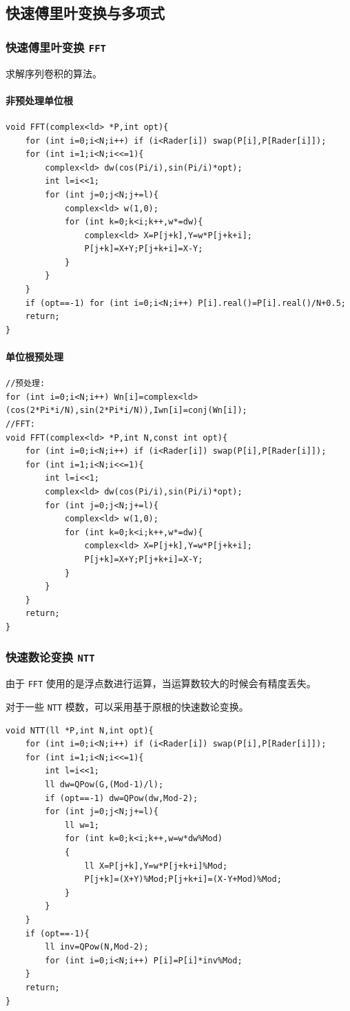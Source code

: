 \documentclass[UTF-8]{ctexart}
\begin{document}
	\subsection{快速傅里叶变换与多项式}
	\subsubsection{快速傅里叶变换 \texttt{FFT}}
	求解序列卷积的算法。
	\paragraph{非预处理单位根}
\begin{verbatim}
void FFT(complex<ld> *P,int opt){
    for (int i=0;i<N;i++) if (i<Rader[i]) swap(P[i],P[Rader[i]]);
    for (int i=1;i<N;i<<=1){
        complex<ld> dw(cos(Pi/i),sin(Pi/i)*opt);
        int l=i<<1;
        for (int j=0;j<N;j+=l){
            complex<ld> w(1,0);
            for (int k=0;k<i;k++,w*=dw){
                complex<ld> X=P[j+k],Y=w*P[j+k+i];
                P[j+k]=X+Y;P[j+k+i]=X-Y;
            }
        }
    }
    if (opt==-1) for (int i=0;i<N;i++) P[i].real()=P[i].real()/N+0.5;
    return;
}
\end{verbatim}
    \paragraph{单位根预处理}
\begin{verbatim}
//预处理:
for (int i=0;i<N;i++) Wn[i]=complex<ld>(cos(2*Pi*i/N),sin(2*Pi*i/N)),Iwn[i]=conj(Wn[i]);
//FFT:
void FFT(complex<ld> *P,int N,const int opt){
    for (int i=0;i<N;i++) if (i<Rader[i]) swap(P[i],P[Rader[i]]);
    for (int i=1;i<N;i<<=1){
        int l=i<<1;
        complex<ld> dw(cos(Pi/i),sin(Pi/i)*opt);
        for (int j=0;j<N;j+=l){
            complex<ld> w(1,0);
            for (int k=0;k<i;k++,w*=dw){
                complex<ld> X=P[j+k],Y=w*P[j+k+i];
                P[j+k]=X+Y;P[j+k+i]=X-Y;
            }
        }
    }
    return;
}
\end{verbatim}
	\subsubsection{快速数论变换 \texttt{NTT}}
	由于 \texttt{FFT} 使用的是浮点数进行运算，当运算数较大的时候会有精度丢失。
	
	对于一些 \texttt{NTT} 模数，可以采用基于原根的快速数论变换。
\begin{verbatim}
void NTT(ll *P,int N,int opt){
    for (int i=0;i<N;i++) if (i<Rader[i]) swap(P[i],P[Rader[i]]);
    for (int i=1;i<N;i<<=1){
        int l=i<<1;
        ll dw=QPow(G,(Mod-1)/l);
        if (opt==-1) dw=QPow(dw,Mod-2);
        for (int j=0;j<N;j+=l){
            ll w=1;
            for (int k=0;k<i;k++,w=w*dw%Mod)
            {
                ll X=P[j+k],Y=w*P[j+k+i]%Mod;
                P[j+k]=(X+Y)%Mod;P[j+k+i]=(X-Y+Mod)%Mod;
            }
        }
    }
    if (opt==-1){
        ll inv=QPow(N,Mod-2);
        for (int i=0;i<N;i++) P[i]=P[i]*inv%Mod;
    }
    return;
}
\end{verbatim}
\end{document}
